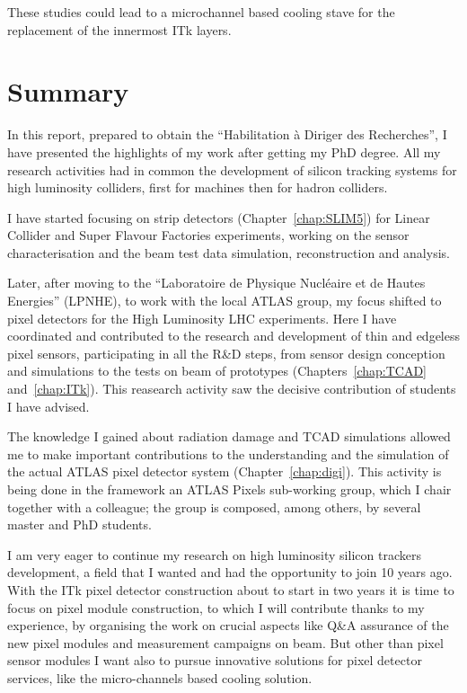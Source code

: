 These studies could lead to a microchannel based cooling stave for the replacement of the innermost 
ITk layers.

\chapter*{Summary}
In this report, prepared  to obtain the  ``Habilitation \`a Diriger des Recherches'', I have 
presented the highlights of my work  after getting my PhD degree. 
All my research activities had in common the development of silicon tracking systems for high luminosity 
colliders, first for \epem machines then for hadron colliders. 

I have started focusing on strip detectors (Chapter~\ref{chap:SLIM5}) for Linear Collider and Super 
Flavour Factories experiments,  working on the sensor characterisation and the beam test data simulation, 
reconstruction and analysis. 

Later, after moving to the  ``Laboratoire de Physique Nucl\'eaire et de Hautes Energies'' (LPNHE), to 
work with the local ATLAS group, my focus shifted to pixel detectors for the High Luminosity LHC 
experiments. Here I have coordinated and contributed to the research and development of thin and edgeless 
pixel sensors, participating in all the R\&D steps, from sensor design conception and simulations to 
the tests on beam of prototypes (Chapters~\ref{chap:TCAD} and~\ref{chap:ITk}). 
 This reasearch activity saw the decisive contribution of students I have 
 advised.

The knowledge I gained about radiation damage and TCAD simulations allowed me to make important 
contributions to the understanding and the simulation of the actual ATLAS pixel detector system 
(Chapter~\ref{chap:digi}). This activity is being done in the framework 
an ATLAS Pixels sub-working group, which I chair together with a colleague; 
the group is composed, among others, by several master and PhD students.

I am very eager to continue my research on high luminosity silicon trackers development, 
a field that I wanted and had the opportunity to join 10 years ago. 
With the ITk pixel detector construction about to start in two years it is time to focus on pixel 
module construction, to which I will contribute thanks to my experience, 
by organising the work on crucial aspects like Q\&A assurance of the new pixel modules and measurement campaigns on beam. But other than 
pixel sensor modules I want also to pursue innovative solutions for pixel detector services, 
like the micro-channels based cooling solution.

